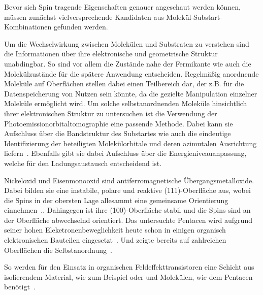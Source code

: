     Bevor sich Spin tragende Eigenschaften genauer angeschaut werden können, müssen zunächst vielversprechende Kandidaten aus Molekül-Substart-Kombinationen gefunden werden.

    Um die Wechselwirkung zwischen Molekülen und Substraten zu verstehen sind die Informationen über ihre elektronische und geometrische Struktur unabdingbar.
    So sind vor allem die Zustände nahe der Fermikante wie auch die Molekülzustände für die spätere Anwendung entscheiden.
    Regelmäßig anordnende Moleküle auf Oberflächen stellen dabei einen Teilbereich dar, der z.B. für die Datenspeicherung von Nutzen sein könnte, da die gezielte Manipulation einzelner Moleküle ermöglicht wird.
    Um solche selbstanordnenden Moleküle hinsichtlich ihrer elektronischen Struktur zu untersuchen ist die Verwendung der Photoemissionorbitaltomographie eine passende Methode.
    Dabei kann sie Aufschluss über die Bandstruktur des Substartes wie auch die eindeutige Identifizierung der beteiligten Molekülorbitale und deren azimutalen Ausrichtung liefern~\cite{MM_2, MM_5}.
    Ebenfalls gibt sie dabei Aufschluss über die Energieniveauanpassung, welche für den Ladungsaustausch entscheidend ist.

    Nickeloxid und Eisenmonooxid sind antiferromagnetische Übergangsmetalloxide.
    Dabei bilden sie eine instabile, polare und reaktive (111)-Oberfläche aus, wobei die Spins in der obersten Lage allesammt eine gemeinsame Orientierung einnehmen~\cite{cappus_hydroxyl_1993}..
    Dahingegen ist ihre (100)-Oberfläche stabil und die Spins sind an der Oberfläche abwechselnd orientiert.
    Das untersuchte Pentacen wird aufgrund seiner hohen Eleketronenbeweglichkeit heute schon in einigen organisch elektronischen Bauteilen eingesetzt~\cite{5A_13, 5A_4}.
    Und zeigte bereits auf zahlreichen Oberflächen die Selbstanordnung~\cite{5A_1, 5A_4, 5A_6, 5A_10, 5A_5, 5A_9}.
    
    So werden für den Einsatz in organischen Feldeffekttransistoren eine Schicht aus isolierendem Material, wie zum Beispiel  oder  und Molekülen, wie dem Pentacen benötigt~\cite{5A_13}.


